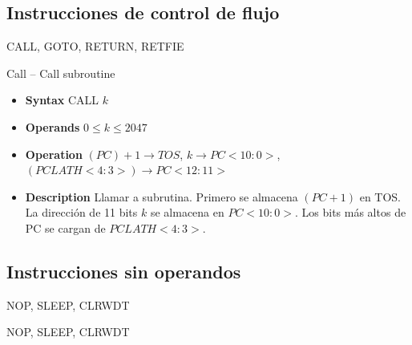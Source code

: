 \documentclass[xcolor=dvipsnames,handout]{beamer}
\begin{document}
\subsection[Control de flujo]{Instrucciones de control de flujo}  %

\begin{frame}{CALL, GOTO, RETURN, RETFIE}
    \begin{block}{Call -- Call subroutine}
      \begin{itemize}
	\item\textbf{Syntax} CALL $k$
	\item\textbf{Operands} $0\leq k\leq 2047$
	\item\textbf{Operation} $(PC)+1\rightarrow TOS$, $k\rightarrow PC<10:0>$, $(PCLATH<4:3>)\rightarrow PC<12:11>$
	\item\textbf{Description} Llamar a subrutina. Primero se almacena $(PC+1)$ en TOS. La dirección de 11 bits $k$ se almacena en $PC<10:0>$. Los bits más altos de PC se cargan de $PCLATH<4:3>$.
      \end{itemize}      
  \end{block}
\end{frame}

\subsection[Sin operandos]{Instrucciones sin operandos} %

\begin{frame}{NOP, SLEEP, CLRWDT}
\end{frame}
\begin{frame}{NOP, SLEEP, CLRWDT}

\end{frame}
\end{document}
